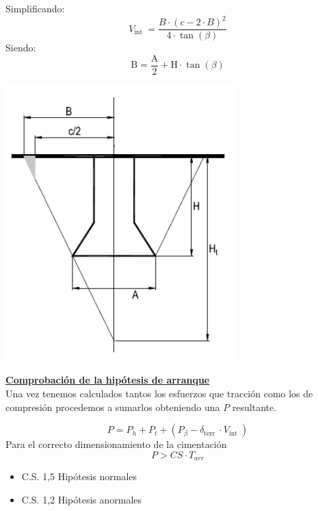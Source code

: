 \documentclass{article}
\begin{document}
\begin{itemize}
\begin{itemize}
$$$$
Simplificando:
$$
V_{\text {int }}=\frac{B \cdot(c-2 \cdot B)^{2}}{4 \cdot \tan (\beta)}
$$
Siendo:
$$
\mathrm{B}=\frac{\mathrm{A}}{2}+\mathrm{H} \cdot \tan (\beta)
$$
                        \begin{center}
                            \includegraphics[scale = 0.4]{assets/img/Patas Separadas/interferencia cuadrada.png}
                        \end{center}
                    \end{itemize}
            \end{itemize}
            
        \textbf{\underline{Comprobación de la hipótesis de arranque}} \\
            
            Una vez tenemos calculados tantos los esfuerzos que tracción como los de compresión procedemos a sumarlos obteniendo una $P$ resultante.
            
            $$
            P=P_{h}+P_{t}+\left(P_{\beta}-\delta_{\text {terr }} \cdot V_{\text {int }}\right)
            $$
            Para el correcto dimensionamiento de la cimentación
            $$
            P>C S \cdot T_{a r r}
            $$
            \begin{itemize}
                \item C.S. 1,5 Hipótesis normales
                \item C.S. 1,2 Hipótesis anormales
            \end{itemize}
            
\end{document}
